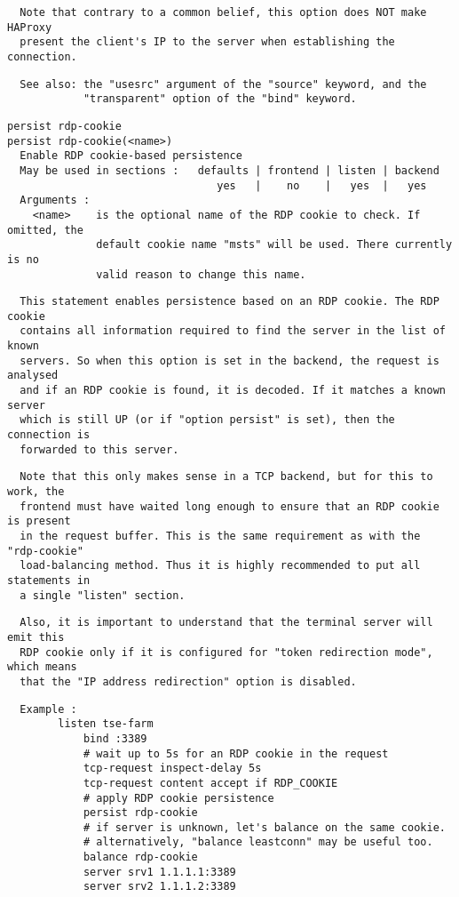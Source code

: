 \begin{verbatim}
  Note that contrary to a common belief, this option does NOT make HAProxy
  present the client's IP to the server when establishing the connection.
\end{verbatim}

\begin{verbatim}
  See also: the "usesrc" argument of the "source" keyword, and the
            "transparent" option of the "bind" keyword.
\end{verbatim}

\begin{verbatim}
persist rdp-cookie
persist rdp-cookie(<name>)
  Enable RDP cookie-based persistence
  May be used in sections :   defaults | frontend | listen | backend
                                 yes   |    no    |   yes  |   yes
  Arguments :
    <name>    is the optional name of the RDP cookie to check. If omitted, the
              default cookie name "msts" will be used. There currently is no
              valid reason to change this name.
\end{verbatim}

\begin{verbatim}
  This statement enables persistence based on an RDP cookie. The RDP cookie
  contains all information required to find the server in the list of known
  servers. So when this option is set in the backend, the request is analysed
  and if an RDP cookie is found, it is decoded. If it matches a known server
  which is still UP (or if "option persist" is set), then the connection is
  forwarded to this server.
\end{verbatim}

\begin{verbatim}
  Note that this only makes sense in a TCP backend, but for this to work, the
  frontend must have waited long enough to ensure that an RDP cookie is present
  in the request buffer. This is the same requirement as with the "rdp-cookie"
  load-balancing method. Thus it is highly recommended to put all statements in
  a single "listen" section.
\end{verbatim}

\begin{verbatim}
  Also, it is important to understand that the terminal server will emit this
  RDP cookie only if it is configured for "token redirection mode", which means
  that the "IP address redirection" option is disabled.
\end{verbatim}

\begin{verbatim}
  Example :
        listen tse-farm
            bind :3389
            # wait up to 5s for an RDP cookie in the request
            tcp-request inspect-delay 5s
            tcp-request content accept if RDP_COOKIE
            # apply RDP cookie persistence
            persist rdp-cookie
            # if server is unknown, let's balance on the same cookie.
            # alternatively, "balance leastconn" may be useful too.
            balance rdp-cookie
            server srv1 1.1.1.1:3389
            server srv2 1.1.1.2:3389
\end{verbatim}

